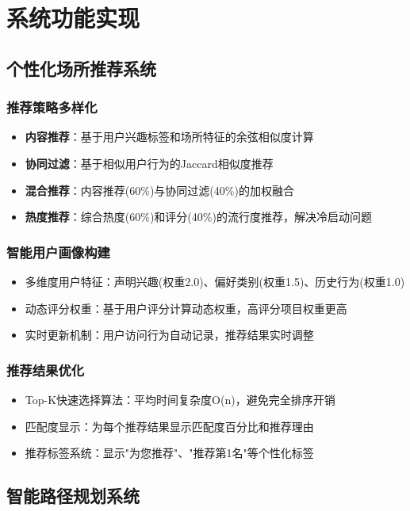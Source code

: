 \documentclass[12pt,a4paper]{article}
\begin{document}
\section{系统功能实现}

\subsection{个性化场所推荐系统}
\subsubsection{推荐策略多样化}
\begin{itemize}
    \item \textbf{内容推荐}：基于用户兴趣标签和场所特征的余弦相似度计算
    \item \textbf{协同过滤}：基于相似用户行为的Jaccard相似度推荐
    \item \textbf{混合推荐}：内容推荐(60\%)与协同过滤(40\%)的加权融合
    \item \textbf{热度推荐}：综合热度(60\%)和评分(40\%)的流行度推荐，解决冷启动问题
\end{itemize}

\subsubsection{智能用户画像构建}
\begin{itemize}
    \item 多维度用户特征：声明兴趣(权重2.0)、偏好类别(权重1.5)、历史行为(权重1.0)
    \item 动态评分权重：基于用户评分计算动态权重，高评分项目权重更高
    \item 实时更新机制：用户访问行为自动记录，推荐结果实时调整
\end{itemize}

\subsubsection{推荐结果优化}
\begin{itemize}
    \item Top-K快速选择算法：平均时间复杂度O(n)，避免完全排序开销
    \item 匹配度显示：为每个推荐结果显示匹配度百分比和推荐理由
    \item 推荐标签系统：显示"为您推荐"、"推荐第1名"等个性化标签
\end{itemize}

\subsection{智能路径规划系统}
\end{document}
